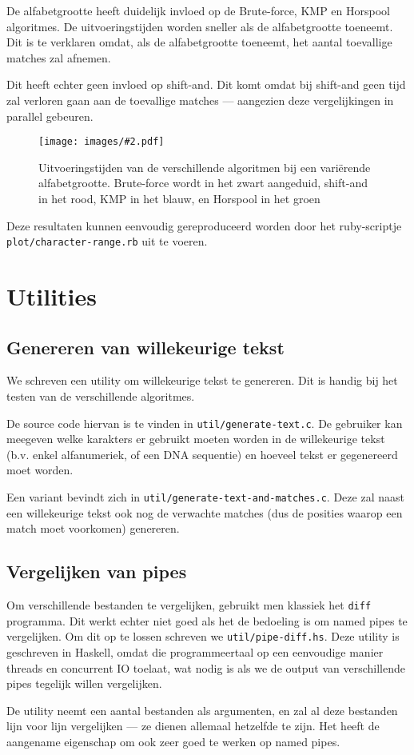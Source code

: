 \documentclass[a4paper,11pt]{article}
\newcommand{\image}[3][1]{
    \begin{figure}
    \begin{center}
    \texttt{[image: images/\#2.pdf]}
    \caption{#3}
    \label{fig:#2}
    \end{center}
    \end{figure}
}
\newcommand{\reproduce}[1]{
    Deze resultaten kunnen eenvoudig gereproduceerd worden door het
    ruby-scriptje \texttt{#1} uit te voeren.
}
\begin{document}
De alfabetgrootte heeft duidelijk invloed op de Brute-force, KMP en Horspool
algoritmes. De uitvoeringstijden worden sneller als de alfabetgrootte toeneemt.
Dit is te verklaren omdat, als de alfabetgrootte toeneemt, het aantal toevallige
matches zal afnemen.

Dit heeft echter geen invloed op shift-and. Dit komt omdat bij shift-and geen
tijd zal verloren gaan aan de toevallige matches — aangezien deze vergelijkingen
in parallel gebeuren.

\image{plot-character-range}{Uitvoeringstijden van de verschillende algoritmen
bij een vari\"erende alfabetgrootte. Brute-force wordt in het zwart aangeduid,
shift-and in het rood, KMP in het blauw, en Horspool in het groen}

\reproduce{plot/character-range.rb}

\section{Utilities}

\subsection{Genereren van willekeurige tekst}
\label{generate-text}

We schreven een utility om willekeurige tekst te genereren. Dit is handig bij
het testen van de verschillende algoritmes.

De source code hiervan is te vinden in \verb#util/generate-text.c#. De gebruiker
kan meegeven welke karakters er gebruikt moeten worden in de willekeurige tekst
(b.v. enkel alfanumeriek, of een DNA sequentie) en hoeveel tekst er gegenereerd
moet worden.

\label{generate-text-and-matches}
Een variant bevindt zich in \verb#util/generate-text-and-matches.c#. Deze zal
naast een willekeurige tekst ook nog de verwachte matches (dus de posities
waarop een match moet voorkomen) genereren.

\subsection{Vergelijken van pipes}
\label{pipe-diff}

Om verschillende bestanden te vergelijken, gebruikt men klassiek het \verb#diff#
programma. Dit werkt echter niet goed als het de bedoeling is om named pipes
te vergelijken. Om dit op te lossen schreven we \verb#util/pipe-diff.hs#. Deze
utility is geschreven in Haskell, omdat die programmeertaal op een eenvoudige
manier threads en concurrent IO toelaat, wat nodig is als we de output van
verschillende pipes tegelijk willen vergelijken.

De utility neemt een aantal bestanden als argumenten, en zal al deze bestanden
lijn voor lijn vergelijken — ze dienen allemaal hetzelfde te zijn. Het heeft de
aangename eigenschap om ook zeer goed te werken op named pipes.
\end{document}
